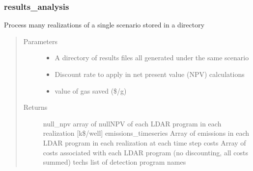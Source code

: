 \documentclass[letterpaper,10pt,english]{sphinxmanual}
\begin{document}
\subsubsection{results\_analysis}
\label{\detokenize{index:results-analysis}}

\begin{fulllineitems}
\label{\detokenize{index:feast.ResultsProcessing.results_analysis_functions.results_analysis}}
Process many realizations of a single scenario stored in a directory
\begin{quote}\begin{description}
\item[{Parameters}] \leavevmode\begin{itemize}
\item {} 
 \textendash{} A directory of results files all generated under the same scenario

\item {} 
 \textendash{} Discount rate to apply in net present value (NPV) calculations

\item {} 
 \textendash{} value of gas saved (\$/g)

\end{itemize}

\item[{Returns}] \leavevmode
null\_npv          array of null\sphinxhyphen{}NPV of each LDAR program in each realization {[}k\$/well{]}
emissions\_timeseries  Array of emissions in each LDAR program in each realization at each time step
costs                 Array of costs associated with each LDAR program (no discounting, all costs summed)
techs           list of detection program names

\end{description}\end{quote}

\end{fulllineitems}
\end{document}
